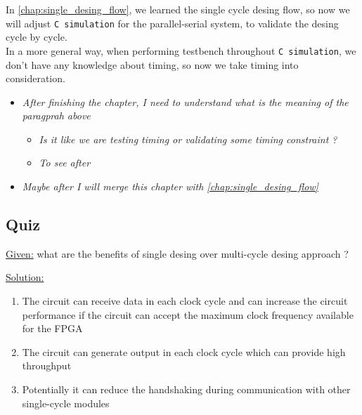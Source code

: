 In \autoref{chap:single_desing_flow}, we learned the single cycle desing flow, so now we will adjust \verb|C simulation| for the parallel-serial system, to validate the desing cycle by cycle.\\

In a more general way, when performing testbench throughout \verb|C simulation|, we don't have any knowledge about timing, so now we take timing into consideration.


 

\begin{itemize}

\item \textit{After finishing the chapter, I need to understand what is the meaning of the paragprah above}

	\begin{itemize}
	\item \textit{Is it like we are testing timing or validating some timing constraint ?}
	
	\item \textit{To see after}	
	
	\end{itemize}

\end{itemize}


 

\begin{itemize}

\item \textit{Maybe after I will merge this chapter with \autoref{chap:single_desing_flow} }

\end{itemize}

\subsection{Quiz}

\underline{Given:} what are the benefits of single desing over multi-cycle desing approach ?

\underline{Solution:}

\begin{enumerate}

\item The circuit can receive data in each clock cycle and can increase the
circuit performance if the circuit can accept the maximum clock
frequency available for the FPGA

\item The circuit can generate output in each clock cycle which can provide
high throughput

\item Potentially it can reduce the handshaking during communication with
other single-cycle modules
 
\end{enumerate}



